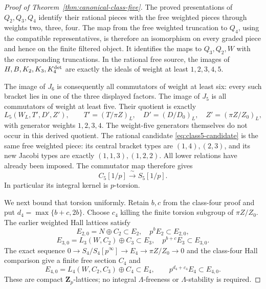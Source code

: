 \documentclass[11pt]{article}
\theoremstyle{definition}\newtheorem{definition}[theorem]{Definition}
\begin{document}
\begin{proof}[Proof of Theorem~\ref{thm:canonical-class-five}]
The proved presentations of $Q_2,Q_3,Q_4$ identify
their rational pieces with the free weighted pieces
through weights two, three, four. The map from the
free weighted truncation to $Q_4$, using the compatible
representatives, is therefore an isomorphism on every
graded piece and hence on the finite filtered object.
It identifies the maps to $Q_3,Q_2,W$ with the
corresponding truncations. In the rational free source,
the images of $H,B,K_2,K_3,K_4^{\rm det}$ are exactly
the ideals of weight at least $1,2,3,4,5$.

The image of $J_6$ is consequently all commutators of
weight at least six: every such bracket lies in one
of the three displayed factors. The image of $J_5$
is all commutators of weight at least five. Their
quotient is exactly
\[
 L_5(W_L,T',D',Z'),\qquad
 T'=(T/\pi Z)_L,\quad D'=(D/D_0)_L,\quad
 Z'=(\pi Z/Z_0)_L,
\]
with generator weights $1,2,3,4$.
The weight-five generators themselves do not occur
in this derived quotient. The rational candidate
\eqref{eq:class5-candidate} is the same free weighted
piece: its central bracket types are $(1,4),(2,3)$,
and its new Jacobi types are exactly $(1,1,3),(1,2,2)$.
All lower relations have already been imposed.
The commutator map therefore gives
\begin{equation}\label{eq:class5-rational-source}
              C_5[1/p]\xrightarrow{\ \sim\ }S_5[1/p].
\end{equation}
In particular its integral kernel is $p$-torsion.

We next bound that torsion uniformly. Retain $b,c$
from the class-four proof and put
$d_4=\max\{b+c,2b\}$. Choose $c_4$ killing the finite
torsion subgroup of $\pi Z/Z_0$. The earlier weighted
Hall lattices satisfy
\[
 E_{2,0}=N\oplus C_2\subset E_2,\quad p^bE_2\subset E_{2,0},
\]
\[
 E_{3,0}=L_3(W,C_2)\oplus C_3\subset E_3,
                      \quad p^{b+c}E_3\subset E_{3,0}.
\]
The exact sequence
$0\to S_4/S_4[p^\infty]\to E_4\to\pi Z/Z_0\to0$
and the class-four Hall comparison give a finite
free section $C_4$ and
\[
 E_{4,0}=L_4(W,C_2,C_3)\oplus C_4\subset E_4,
                 \qquad p^{d_4+c_4}E_4\subset E_{4,0}.
\]
These are compact $\mathbf Z_p$-lattices; no integral
$\Lambda$-freeness or $\Lambda$-stability is required.


\end{proof}
\end{document}
